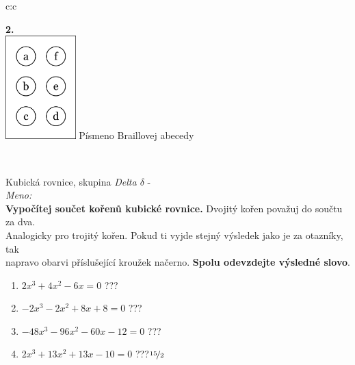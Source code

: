 \documentclass[10pt]{report}
\begin{document}
\begin{tabular}{c:c}
\begin{minipage}[c][99mm][t]{0.49\linewidth}
\begin{center}
\begin{minipage}{0.77\linewidth}
\begin{center}
\begin{varwidth}{\textwidth}
\end{varwidth}
\end{center}
\end{minipage}
\begin{minipage}{0.20\linewidth}
\begin{center}
{\Huge\bfseries 2.} \\[2mm]
\includegraphics[height=40mm]{../images/braille.png}
{\small Písmeno Braillovej abecedy}
\end{center}
\end{minipage}
\end{center}
\end{minipage}
\\ \hdashline
\begin{minipage}[c][99mm][t]{0.49\linewidth}
\begin{center}
\vspace{7mm}
{\huge Kubická rovnice, skupina \textit{Delta $\delta$} -}\\[4.5mm]
\textit{Meno:}\phantom{xxxxxxxxxxxxxxxxxxxxxxxxxxxxxxxxxxxxxxxxxxxxxxxxxxxxxxxxxxxxxxxxx}\\[3.5mm]
\textbf{Vypočítej součet kořenů kubické rovnice.} Dvojitý kořen považuj do součtu za dva.\\Analogicky pro trojitý kořen. Pokud ti vyjde stejný výsledek jako je za otazníky, tak\\napravo obarvi příslušející kroužek načerno. \textbf{Spolu odevzdejte výsledné slovo}.\\[3mm]
\begin{minipage}{0.77\linewidth}
\begin{center}
\begin{varwidth}{\textwidth}
\begin{enumerate}
\large
\item $2x^3+4x^2-6x=0$\quad \dotfill\; ???\;\dotfill {}
\item $-2x^3-2x^2+8x+8=0$\quad \dotfill\; ???\;\dotfill {}
\item $-48x^3-96x^2-60x-12=0$\quad \dotfill\; ???\;\dotfill {}
\item $2x^3+13x^2+13x-10=0$\quad \dotfill\; ???\;\dotfill \quad $\nicefrac{15}{2}$

\end{enumerate}
\end{varwidth}
\end{center}
\end{minipage}
\end{center}
\end{minipage}
\end{tabular}
\end{document}
